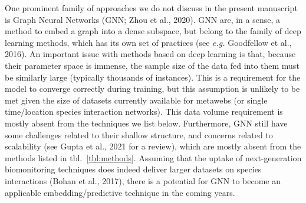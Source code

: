 \documentclass[11pt]{article}
\begin{document}
One prominent family of approaches we do not discuss in the present
manuscript is Graph Neural Networks (GNN; Zhou et al., 2020). GNN are,
in a sense, a method to embed a graph into a dense subspace, but belong
to the family of deep learning methods, which has its own set of
practices (see \emph{e.g.} Goodfellow et al., 2016). An important issue
with methods based on deep learning is that, because their parameter
space is immense, the sample size of the data fed into them must be
similarly large (typically thousands of instances). This is a
requirement for the model to converge correctly during training, but
this assumption is unlikely to be met given the size of datasets
currently available for metawebs (or single time/location species
interaction networks). This data volume requirement is mostly absent
from the techniques we list below. Furthermore, GNN still have some
challenges related to their shallow structure, and concerns related to
scalability (see Gupta et al., 2021 for a review), which are mostly
absent from the methods listed in tbl.~\ref{tbl:methods}. Assuming that
the uptake of next-generation biomonitoring techniques does indeed
deliver larger datasets on species interactions (Bohan et al., 2017),
there is a potential for GNN to become an applicable
embedding/predictive technique in the coming years.
\end{document}
